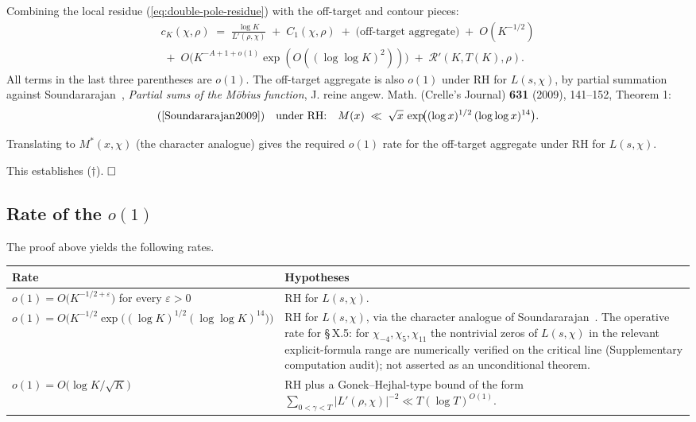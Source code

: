 Combining the local residue (\ref{eq:double-pole-residue}) with the
off-target and contour pieces:
\begin{multline*}
c_K(\chi, \rho)
\;=\;
\frac{\log K}{L'(\rho, \chi)}
\;+\;
C_1(\chi, \rho)
\;+\;
\bigl(\text{off-target aggregate}\bigr)
\;+\;
O(K^{-1/2})
\\
\;+\;
O\!\bigl(K^{-A+1+o(1)}\exp(O((\log\log K)^2))\bigr)
\;+\;
\mathcal{R}'(K, T(K), \rho).
\end{multline*}
All terms in the last three parentheses are \(o(1)\). The off-target
aggregate is also \(o(1)\) under RH for \(L(s, \chi)\), by partial
summation against Soundararajan~\cite{Soundararajan2009}, \emph{Partial sums of the Möbius
function}, J. reine angew. Math. (Crelle's Journal) \textbf{631} (2009),
141--152, Theorem 1:
\[
\text{(\cite{Soundararajan2009})}
\quad
\text{under RH:}\quad
M(x) \;\ll\; \sqrt x \,\exp\!\bigl((\log x)^{1/2}\,(\log\log x)^{14}\bigr).
\]

Translating to \(M^*(x, \chi)\) (the character analogue) gives the
required \(o(1)\) rate for the off-target aggregate under RH for
\(L(s, \chi)\).

This establishes (\(\dagger\)). \(\hfill\square\)

\subsection{Rate of the \(o(1)\)}

The proof above yields the following rates.

{\def\LTcaptype{none} %
\begin{longtable}[]{@{}
  >{\raggedright\arraybackslash}p{}
  >{\raggedright\arraybackslash}p{}@{}}
\toprule\noalign{}
\begin{minipage}[b]{\linewidth}\raggedright
Rate
\end{minipage} & \begin{minipage}[b]{\linewidth}\raggedright
Hypotheses
\end{minipage} \\
\midrule\noalign{}
\endhead
\bottomrule\noalign{}
\endlastfoot
\(o(1) = O\bigl(K^{-1/2 + \varepsilon}\bigr)\) for every \(\varepsilon > 0\) & RH for \(L(s, \chi)\). \\
\(o(1) = O\bigl(K^{-1/2}\exp\bigl((\log K)^{1/2}(\log\log K)^{14}\bigr)\bigr)\) & RH for \(L(s, \chi)\), via the character analogue of Soundararajan~\cite[Theorem~1]{Soundararajan2009}. The operative rate for \S\,X.5: for \(\chi_{-4}, \chi_5, \chi_{11}\) the nontrivial zeros of \(L(s,\chi)\) in the relevant explicit-formula range are numerically verified on the critical line (Supplementary computation audit); not asserted as an unconditional theorem. \\
\(o(1) = O\bigl(\log K / \sqrt K\bigr)\) & RH plus a Gonek--Hejhal-type bound of the form \(\sum_{0 < \gamma < T} |L'(\rho, \chi)|^{-2} \ll T (\log T)^{O(1)}\). \\
\end{longtable}
}

